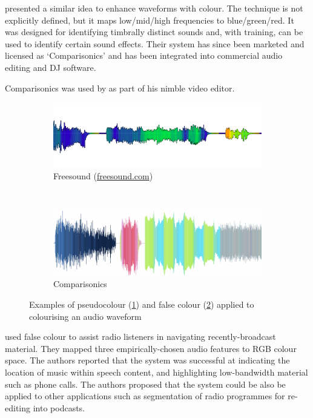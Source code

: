 \citet{Rice2005} presented a similar idea to enhance waveforms with colour. The technique is not
explicitly defined, but it maps low/mid/high frequencies to blue/green/red. It was designed for identifying
timbrally distinct sounds and, with training, can be used to identify certain sound effects. Their system has since
been marketed and licensed as `Comparisonics' and has been integrated into commercial audio editing and DJ
software.

Comparisonics was used by \citet{Loviscach2011a} as part of his nimble video editor.

\begin{figure}[p]
\centering
\begin{subfigure}{\textwidth}
  \centering
  \includegraphics[width=\linewidth]{figs/freesound2.png}
  \caption{Freesound (\url{freesound.com})}
  \label{fig:freesound}
\end{subfigure}\\%
\begin{subfigure}{\textwidth}
  \centering
  \includegraphics[width=\linewidth]{figs/rice.png}
  \caption{Comparisonics \citep{Rice2005}}
  \label{fig:rice}
\end{subfigure}
\caption{Examples of pseudocolour (\ref{fig:freesound}) and false colour
  (\ref{fig:rice}) applied to colourising an audio waveform}
\label{fig:colourvis}
\end{figure}

\citet{Mason2007} used false colour to assist radio listeners in navigating recently-broadcast material. They mapped
three empirically-chosen audio features to RGB colour space. The authors reported that the system was successful at
indicating the location of music within speech content, and highlighting low-bandwidth material such as phone calls.
The authors proposed that the system could be also be applied to other applications such as segmentation of radio
programmes for re-editing into podcasts.

